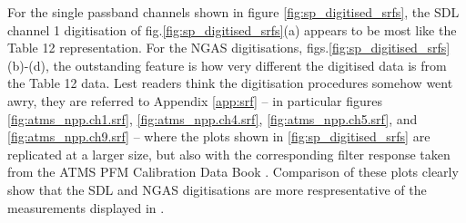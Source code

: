 For the single passband channels shown in figure \ref{fig:sp_digitised_srfs}, the SDL channel 1 digitisation of fig.\ref{fig:sp_digitised_srfs}(a) appears to be most like the Table 12 representation. For the NGAS digitisations, figs.\ref{fig:sp_digitised_srfs}(b)-(d), the outstanding feature is how very different the digitised data is from the Table 12 data. Lest readers think the digitisation procedures somehow went awry, they are referred to Appendix \ref{app:srf} -- in particular figures \ref{fig:atms_npp.ch1.srf}, \ref{fig:atms_npp.ch4.srf}, \ref{fig:atms_npp.ch5.srf}, and \ref{fig:atms_npp.ch9.srf} -- where the plots shown in \ref{fig:sp_digitised_srfs} are replicated at a larger size, but also with the corresponding filter response taken from the ATMS PFM Calibration Data Book \cite{ATMS_PFM_CalLog}. Comparison of these plots clearly show that the SDL and NGAS digitisations are more respresentative of the measurements displayed in \cite{ATMS_PFM_CalLog}.

